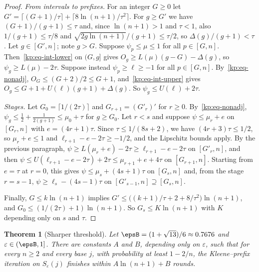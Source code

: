 \documentclass[11pt]{amsart}
\newtheorem{theorem}{Theorem}
\theoremstyle{definition}
\theoremstyle{remark}
\newcommand{\eps}{\varepsilon}
\begin{document}
\begin{proof}
\emph{From intervals to prefixes.} For an integer $G\ge 0$ let
$G'=\lceil(G+1)/\tau\rceil+\lceil 8\ln(n+1)/\tau^2\rceil$. For $g\ge G'$ we
have $(G+1)/(g+1)\le\tau$ and, since $\ln(n+1)>1$ and $\tau<1$, also
$1/(g+1)\le\tau/8$ and $\sqrt{2g\ln(n+1)}/(g+1)\le\tau/2$, so
$\Delta(g)/(g+1)<\tau$. Let $g\in[G',n]$; note $g>G$. Suppose $\psi_p\le\mu\le1$
for all $p\in[G,n]$. Then~\eqref{kp:eq-int-lower} on $(G,g]$ gives
$O_g\ge L(\mu)(g-G)-\Delta(g)$, so $\psi_g\ge L(\mu)-2\tau$. Suppose instead
$\psi_p\ge\ell\ge-1$ for all $p\in[G,n]$. By~\eqref{kp:eq-nonadj},
$O_G\le(G+2)/2\le G+1$, and~\eqref{kp:eq-int-upper} gives
$O_g\le G+1+U(\ell)(g+1)+\Delta(g)$. So $\psi_g\le U(\ell)+2\tau$.

\emph{Stages.} Let $G_0=\lceil 1/(2\tau)\rceil$ and $G_{r+1}=(G'_r)'$ for
$r\ge 0$. By~\eqref{kp:eq-nonadj}, $\psi_g\le\frac12+\frac1{2(g+1)}\le\mu_0+\tau$
for $g\ge G_0$. Let $r<s$ and suppose $\psi\le\mu_r+e$ on $[G_r,n]$ with
$e=(4r+1)\tau$. Since $\tau\le 1/(8s+2)$, we have $(4r+3)\tau\le 1/2$, so
$\mu_r+e\le 1$ and $\ell_{r+1}-e-2\tau\ge-1/2$, and the Lipschitz bounds apply.
By the previous paragraph,
$\psi\ge L(\mu_r+e)-2\tau\ge\ell_{r+1}-e-2\tau$ on $[G'_r,n]$, and then
$\psi\le U(\ell_{r+1}-e-2\tau)+2\tau\le\mu_{r+1}+e+4\tau$ on $[G_{r+1},n]$.
Starting from $e=\tau$ at $r=0$, this gives
$\psi\le\mu_s+(4s+1)\tau$ on $[G_s,n]$ and, from the stage $r=s-1$,
$\psi\ge\ell_s-(4s-1)\tau$ on $[G'_{s-1},n]\supseteq[G_s,n]$.

Finally, $G\le k\ln(n+1)$ implies
$G'\le\bigl((k+1)/\tau+2+8/\tau^2\bigr)\ln(n+1)$, and
$G_0\le(1/(2\tau)+1)\ln(n+1)$. So $G_s\le K\ln(n+1)$ with $K$ depending only
on $s$ and $\tau$.
\end{proof}

\begin{theorem}[Sharper threshold]\label{kp:sharper}
Let $\epsB=(1+\sqrt{13})/6\approx 0.7676$ and $\eps\in(\epsB,1]$. There are
constants $A$ and $B$, depending only on $\eps$, such that for every $n\ge 2$
and every base $j$, with probability at least $1-2/n$, the Kleene--prefix
iteration on $S_\eps(j)$ finishes within $A\ln(n+1)+B$ rounds.
\end{theorem}
\end{document}
